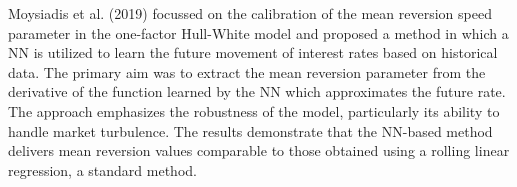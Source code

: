 Moysiadis et al. (2019) focussed on the calibration of the mean reversion speed parameter in the one-factor Hull-White model and proposed a method in which a NN is utilized to learn the future movement of interest rates based on historical data. The primary aim was to extract the mean reversion parameter from the derivative of the function learned by the NN which approximates the future rate. The approach emphasizes the robustness of the model, particularly its ability to handle market turbulence. The results demonstrate that the NN-based method delivers mean reversion values comparable to those obtained using a rolling linear regression, a standard method.